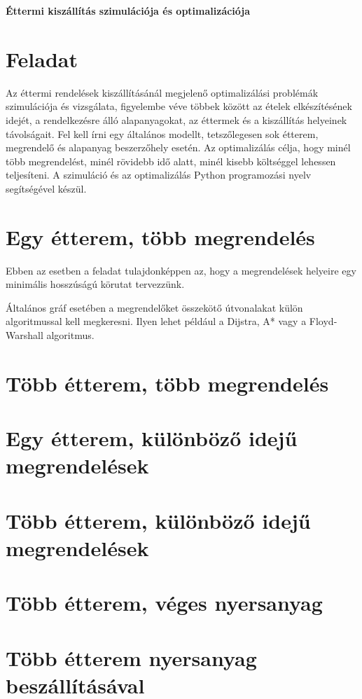 \documentclass[a4paper]{paper}
\begin{document}
\begin{center}
   \large \textbf{Éttermi kiszállítás szimulációja és optimalizációja}
\end{center}

\vskip 1cm

\section{Feladat}

Az éttermi rendelések kiszállításánál megjelenő optimalizálási problémák szimulációja és vizsgálata, figyelembe véve többek között az ételek elkészítésének idejét, a rendelkezésre álló alapanyagokat, az éttermek és a kiszállítás helyeinek távolságait. Fel kell írni egy általános modellt, tetszőlegesen sok étterem, megrendelő és alapanyag beszerzőhely esetén. Az optimalizálás célja, hogy minél több megrendelést, minél rövidebb idő alatt, minél kisebb költséggel lehessen teljesíteni. A szimuláció és az optimalizálás Python programozási nyelv segítségével készül.

\section{Egy étterem, több megrendelés}

Ebben az esetben a feladat tulajdonképpen az, hogy a megrendelések helyeire egy minimális hosszúságú körutat tervezzünk.

Általános gráf esetében a megrendelőket összekötő útvonalakat külön algoritmussal kell megkeresni. Ilyen lehet például a Dijstra, A* vagy a Floyd-Warshall algoritmus.

\section{Több étterem, több megrendelés}

\section{Egy étterem, különböző idejű megrendelések}

\section{Több étterem, különböző idejű megrendelések}

\section{Több étterem, véges nyersanyag}

\section{Több étterem nyersanyag beszállításával}
\end{document}
